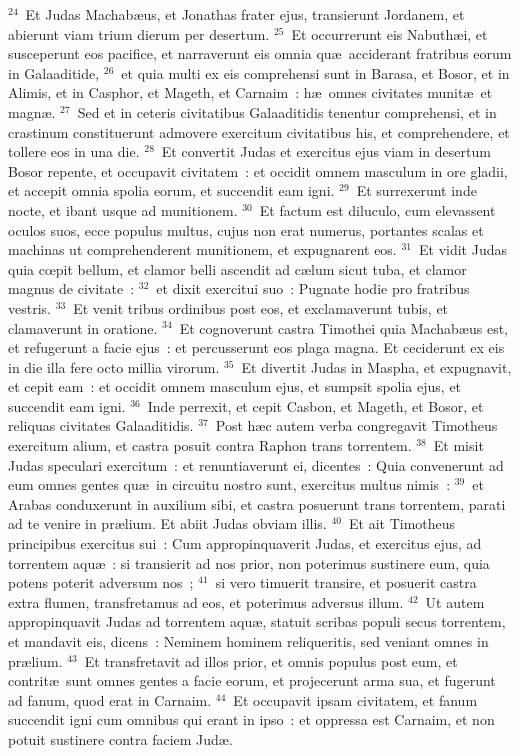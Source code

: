 ${}^{24}$~Et Judas Machab\ae us, et Jonathas frater ejus, transierunt Jordanem, et abierunt viam trium dierum per desertum.
${}^{25}$~Et occurrerunt eis Nabuth\ae i, et susceperunt eos pacifice, et narraverunt eis omnia qu\ae\ acciderant fratribus eorum in Galaaditide,
${}^{26}$~et quia multi ex eis comprehensi sunt in Barasa, et Bosor, et in Alimis, et in Casphor, et Mageth, et Carnaim~: h\ae\ omnes civitates munit\ae\ et magn\ae .
${}^{27}$~Sed et in ceteris civitatibus Galaaditidis tenentur comprehensi, et in crastinum constituerunt admovere exercitum civitatibus his, et comprehendere, et tollere eos in una die.
${}^{28}$~Et convertit Judas et exercitus ejus viam in desertum Bosor repente, et occupavit civitatem~: et occidit omnem masculum in ore gladii, et accepit omnia spolia eorum, et succendit eam igni.
${}^{29}$~Et surrexerunt inde nocte, et ibant usque ad munitionem.
${}^{30}$~Et factum est diluculo, cum elevassent oculos suos, ecce populus multus, cujus non erat numerus, portantes scalas et machinas ut comprehenderent munitionem, et expugnarent eos.
${}^{31}$~Et vidit Judas quia cœpit bellum, et clamor belli ascendit ad c\ae lum sicut tuba, et clamor magnus de civitate~:
${}^{32}$~et dixit exercitui suo~: Pugnate hodie pro fratribus vestris.
${}^{33}$~Et venit tribus ordinibus post eos, et exclamaverunt tubis, et clamaverunt in oratione.
${}^{34}$~Et cognoverunt castra Timothei quia Machab\ae us est, et refugerunt a facie ejus~: et percusserunt eos plaga magna. Et ceciderunt ex eis in die illa fere octo millia virorum.
${}^{35}$~Et divertit Judas in Maspha, et expugnavit, et cepit eam~: et occidit omnem masculum ejus, et sumpsit spolia ejus, et succendit eam igni.
${}^{36}$~Inde perrexit, et cepit Casbon, et Mageth, et Bosor, et reliquas civitates Galaaditidis.
${}^{37}$~Post h\ae c autem verba congregavit Timotheus exercitum alium, et castra posuit contra Raphon trans torrentem.
${}^{38}$~Et misit Judas speculari exercitum~: et renuntiaverunt ei, dicentes~: Quia convenerunt ad eum omnes gentes qu\ae\ in circuitu nostro sunt, exercitus multus nimis~:
${}^{39}$~et Arabas conduxerunt in auxilium sibi, et castra posuerunt trans torrentem, parati ad te venire in pr\ae lium. Et abiit Judas obviam illis.
${}^{40}$~Et ait Timotheus principibus exercitus sui~: Cum appropinquaverit Judas, et exercitus ejus, ad torrentem aqu\ae~: si transierit ad nos prior, non poterimus sustinere eum, quia potens poterit adversum nos~;
${}^{41}$~si vero timuerit transire, et posuerit castra extra flumen, transfretamus ad eos, et poterimus adversus illum.
${}^{42}$~Ut autem appropinquavit Judas ad torrentem aqu\ae , statuit scribas populi secus torrentem, et mandavit eis, dicens~: Neminem hominem reliqueritis, sed veniant omnes in pr\ae lium.
${}^{43}$~Et transfretavit ad illos prior, et omnis populus post eum, et contrit\ae\ sunt omnes gentes a facie eorum, et projecerunt arma sua, et fugerunt ad fanum, quod erat in Carnaim.
${}^{44}$~Et occupavit ipsam civitatem, et fanum succendit igni cum omnibus qui erant in ipso~: et oppressa est Carnaim, et non potuit sustinere contra faciem Jud\ae .


